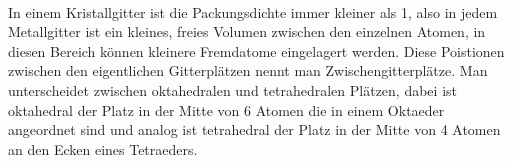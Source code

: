 \documentclass[11pt,a4paper]{article}
\numberwithin{equation}{section}
\numberwithin{figure}{section}
\begin{document}
\\
\begin{addmargin}[25pt]{0pt}    
In einem Kristallgitter ist die Packungsdichte immer kleiner als 1, also in jedem Metallgitter ist ein kleines, freies Volumen zwischen den einzelnen Atomen, in diesen Bereich können kleinere Fremdatome eingelagert werden. Diese Poistionen zwischen den eigentlichen Gitterplätzen nennt man Zwischengitterplätze. Man unterscheidet zwischen oktahedralen und tetrahedralen Plätzen, dabei ist oktahedral der Platz in der Mitte von 6 Atomen die in einem Oktaeder angeordnet sind und analog ist tetrahedral der Platz in der Mitte von 4 Atomen an den Ecken eines Tetraeders.\\
\end{addmargin}
\end{document}
